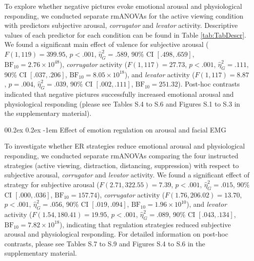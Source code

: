 \documentclass[
  man,floatsintext]{apa6}
\makeatletter
\let\oldparagraph\paragraph
\renewcommand{\paragraph}[1]{\oldparagraph{#1}\mbox{}}
\renewcommand{\paragraph}{\@startsection{paragraph}{4}{\parindent}%
  {0\baselineskip \@plus 0.2ex \@minus 0.2ex}%
  {-1em}%
  {\normalfont\normalsize\bfseries\itshape\typesectitle}}
\makeatother
\begin{document}
To explore whether negative pictures evoke emotional arousal and physiological responding, we conducted separate rmANOVAs for the active viewing condition with predictors subjective arousal, \emph{corrugator} and \emph{levator} activity.
Descriptive values of each predictor for each condition can be found in Table \ref{tab:TabDescr}.
We found a significant main effect of valence for subjective arousal (\(F(1, 119) = 399.95\), \(p < .001\), \(\hat{\eta}^2_G = .589\), 90\% CI \([.498, .659]\), \(\mathrm{BF}_{\textrm{10}} = 2.76 \times 10^{48}\)), \emph{corrugator} activity (\(F(1, 117) = 27.73\), \(p < .001\), \(\hat{\eta}^2_G = .111\), 90\% CI \([.037, .206]\), \(\mathrm{BF}_{\textrm{10}} = 8.05 \times 10^{18}\)), and \emph{levator} activity (\(F(1, 117) = 8.87\), \(p = .004\), \(\hat{\eta}^2_G = .039\), 90\% CI \([.002, .111]\), \(\mathrm{BF}_{\textrm{10}} = 251.32\)).
Post-hoc contrasts indicated that negative pictures successfully increased emotional arousal and physiological responding (please see Tables S.4 to S.6 and Figures S.1 to S.3 in the supplementary material).

\hypertarget{effect-of-emotion-regulation-on-arousal-and-facial-emg}{%
\paragraph{Effect of emotion regulation on arousal and facial EMG}\label{effect-of-emotion-regulation-on-arousal-and-facial-emg}}

To investigate whether ER strategies reduce emotional arousal and physiological responding, we conducted separate rmANOVAs comparing the four instructed strategies (active viewing, distraction, distancing, suppression) with respect to subjective arousal, \emph{corrugator} and \emph{levator} activity.
We found a significant effect of strategy for subjective arousal (\(F(2.71, 322.55) = 7.39\), \(p < .001\), \(\hat{\eta}^2_G = .015\), 90\% CI \([.000, .036]\), \(\mathrm{BF}_{\textrm{10}} = 157.74\)), \emph{corrugator} activity (\(F(1.76, 206.02) = 13.70\), \(p < .001\), \(\hat{\eta}^2_G = .056\), 90\% CI \([.019, .094]\), \(\mathrm{BF}_{\textrm{10}} = 1.96 \times 10^{10}\)), and \emph{levator} activity (\(F(1.54, 180.41) = 19.95\), \(p < .001\), \(\hat{\eta}^2_G = .089\), 90\% CI \([.043, .134]\), \(\mathrm{BF}_{\textrm{10}} = 7.82 \times 10^{18}\)), indicating that regulation strategies reduced subjective arousal and physiological responding.
For detailed information on post-hoc contrasts, please see Tables S.7 to S.9 and Figures S.4 to S.6 in the supplementary material.
\end{document}
